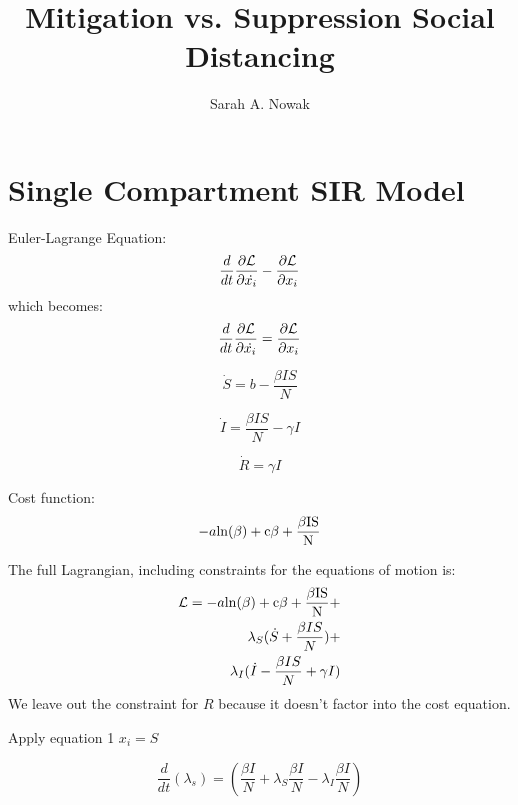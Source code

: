 \documentclass[11pt]{article} %
\title{Mitigation vs. Suppression Social Distancing}
\author{Sarah A. Nowak}
\date{} %
\begin{document}
\maketitle

\section{Single Compartment SIR Model}

Euler-Lagrange Equation:
\begin{equation}
\frac{d}{dt} \frac{\partial \cal{L}}{\partial {\dot{x_i}}}-\frac{\partial \cal{L}}{\partial x_i}
\end{equation}
 which becomes:
\begin{equation}
\frac{d}{dt} \frac{\partial \cal{L}}{\partial {\dot{x_i}}}=\frac{\partial \cal{L}}{\partial x_i}
\label{eq:EL}
\end{equation}


\begin{equation}
\dot{S}= b-\frac{\beta IS}{N}
\end{equation}



\begin{equation}
\dot{I}=\frac{\beta IS}{N}-\gamma I
\label{eq:didt}
\end{equation}

\begin{equation}
\dot{R}=\gamma I
\end{equation}

Cost function:
\begin{equation}
-a\rm{ln}({\beta})+c\beta+\frac{\beta IS}{N}
\label{eq:cost}
\end{equation}

The full Lagrangian, including constraints for the equations of motion is:
\begin{equation}
\begin{split}
\mathcal{L} = -a \rm {ln}({\beta})+c\beta+\frac{\beta IS}{N} +\\
\lambda_S(\dot{S} +\frac{\beta IS}{N})+\\
\lambda_I(\dot{I}-\frac{\beta IS}{N}+\gamma I)
\end{split}
\end{equation}
We leave out the constraint for $R$ because it doesn't factor into the cost equation.

Apply equation 1 $x_i = S$

\begin{equation}
\frac{d}{dt}\left(\lambda_s \right)=\left(\frac{\beta I}{N}+\lambda_S \frac{\beta I}{N} - \lambda_I \frac{\beta I}{N}\right)
\end{equation}
\end{document}
